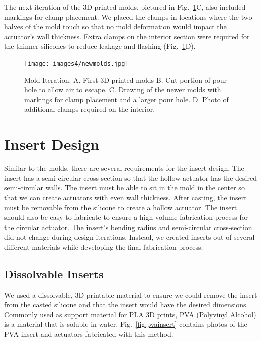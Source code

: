 The next iteration of the 3D-printed molds, pictured in Fig.~\ref{fig:newmolds}C, also included markings for clamp placement. We placed the clamps in locations where the two halves of the mold touch so that no mold deformation would impact the actuator's wall thickness. Extra clamps on the interior section were required for the thinner silicones to reduce leakage and flashing (Fig.~\ref{fig:newmolds}D). \\

\begin{figure}[ht]
    \centering
    \texttt{[image: images4/newmolds.jpg]}
    \caption{Mold Iteration. A. First 3D-printed molds B. Cut portion of pour hole to allow air to escape. C. Drawing of the newer molds with markings for clamp placement and a larger pour hole. D. Photo of additional clamps required on the interior.}
    \label{fig:newmolds}
\end{figure}

\section{Insert Design}

Similar to the molds, there are several requirements for the insert design. The insert has a semi-circular cross-section so that the hollow actuator has the desired semi-circular walls. The insert must be able to sit in the mold in the center so that we can create actuators with even wall thickness. After casting, the insert must be removable from the silicone to create a hollow actuator. The insert should also be easy to fabricate to ensure a high-volume fabrication process for the circular actuator. The insert's bending radius and semi-circular cross-section did not change during design iterations. Instead, we created inserts out of several different materials while developing the final fabrication process. 

\subsection{Dissolvable Inserts}

We used a dissolvable, 3D-printable material to ensure we could remove the insert from the casted silicone and that the insert would have the desired dimensions. Commonly used as support material for PLA 3D prints, PVA (Polyvinyl Alcohol) is a material that is soluble in water. Fig.~\ref{fig:pvainsert} contains photos of the PVA insert and actuators fabricated with this method. 

